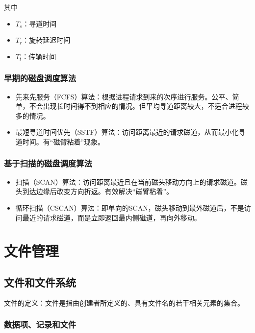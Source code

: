 \documentclass[12pt, a4paper, oneside]{ctexart}
\begin{document}
其中
\begin{itemize}
    \item $T_s$：寻道时间
    \item $T_r$：旋转延迟时间
    \item $T_t$：传输时间
\end{itemize}

\subsubsection{早期的磁盘调度算法}

\begin{itemize}
    \item 先来先服务（FCFS）算法：根据进程请求到来的次序进行服务。公平、简单，不会出现长时间得不到相应的情况。但平均寻道距离较大，不适合进程较多的情况。
    \item 最短寻道时间优先（SSTF）算法：访问距离最近的请求磁道，从而最小化寻道时间。有“磁臂粘着”现象。
\end{itemize}

\subsubsection{基于扫描的磁盘调度算法}

\begin{itemize}
    \item 扫描（SCAN）算法：访问距离最近且在当前磁头移动方向上的请求磁道。磁头到达边缘后改变方向折返。有效解决“磁臂粘着”。
    \item 循环扫描（CSCAN）算法：即单向的SCAN，磁头移动到最外磁道后，不是访问最近的请求磁道，而是立即返回最内侧磁道，再向外移动。
\end{itemize}

\newpage
\section{文件管理}

\subsection{文件和文件系统}

文件的定义：文件是指由创建者所定义的、具有文件名的若干相关元素的集合。

\subsubsection{数据项、记录和文件}
\end{document}
